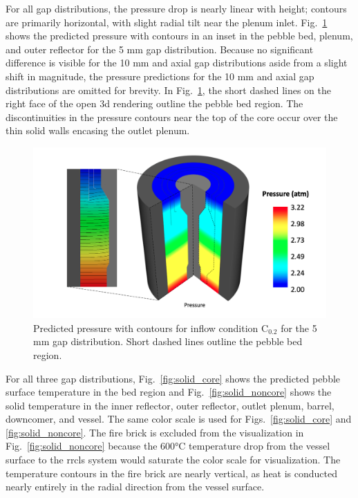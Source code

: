 For all gap distributions, the pressure drop is nearly linear with height; contours are primarily horizontal, with slight radial tilt near the plenum inlet. Fig.\ \ref{fig:pressure_all} shows the predicted pressure with contours in an inset in the pebble bed, plenum, and outer reflector for the 5 \si{\milli\meter} gap distribution. Because no significant difference is visible for the 10 \si{\milli\meter} and axial gap distributions aside from a slight shift in magnitude, the pressure predictions for the 10 \si{\milli\meter} and axial gap distributions are omitted for brevity. In Fig.\ \ref{fig:pressure_all}, the short dashed lines on the right face of the open \gls{3d} rendering outline the pebble bed region. The discontinuities in the pressure contours near the top of the core occur over the thin solid walls encasing the outlet plenum.

\begin{figure}[h!]
\centering
\hspace{1.2cm}
\includegraphics[height=0.4\linewidth]{figs/pressure_all.png}
\caption{Predicted pressure with contours for inflow condition C$_\text{0.2}$ for the 5 \si{\milli\meter} gap distribution. Short dashed lines outline the pebble bed region.}
\label{fig:pressure_all}
\end{figure}

For all three gap distributions, Fig.\ \ref{fig:solid_core} shows the predicted pebble surface temperature in the bed region and Fig.\ \ref{fig:solid_noncore} shows the solid temperature in the inner reflector, outer reflector, outlet plenum, barrel, downcomer, and vessel. The same color scale is used for Figs.\ \ref{fig:solid_core} and \ref{fig:solid_noncore}. The fire brick is excluded from the visualization in Fig.\ \ref{fig:solid_noncore} because the 600\si{\celsius} temperature drop from the vessel surface to the \gls{rrcls} system would saturate the color scale for visualization. The temperature contours in the fire brick are nearly vertical, as heat is conducted nearly entirely in the radial direction from the vessel surface.

